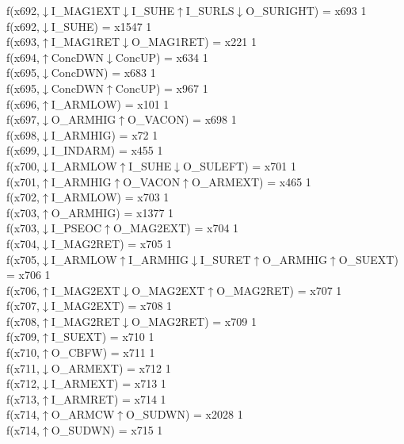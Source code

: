 f(x692,$\downarrow$I\_MAG1EXT$\downarrow$I\_SUHE$\uparrow$I\_SURLS$\downarrow$O\_SURIGHT) = x693 {1} \\
f(x692,$\downarrow$I\_SUHE) = x1547 {1} \\
f(x693,$\uparrow$I\_MAG1RET$\downarrow$O\_MAG1RET) = x221 {1} \\
f(x694,$\uparrow$ConcDWN$\downarrow$ConcUP) = x634 {1} \\
f(x695,$\downarrow$ConcDWN) = x683 {1} \\
f(x695,$\downarrow$ConcDWN$\uparrow$ConcUP) = x967 {1} \\
f(x696,$\uparrow$I\_ARMLOW) = x101 {1} \\
f(x697,$\downarrow$O\_ARMHIG$\uparrow$O\_VACON) = x698 {1} \\
f(x698,$\downarrow$I\_ARMHIG) = x72 {1} \\
f(x699,$\downarrow$I\_INDARM) = x455 {1} \\
f(x700,$\downarrow$I\_ARMLOW$\uparrow$I\_SUHE$\downarrow$O\_SULEFT) = x701 {1} \\
f(x701,$\uparrow$I\_ARMHIG$\uparrow$O\_VACON$\uparrow$O\_ARMEXT) = x465 {1} \\
f(x702,$\uparrow$I\_ARMLOW) = x703 {1} \\
f(x703,$\uparrow$O\_ARMHIG) = x1377 {1} \\
f(x703,$\downarrow$I\_PSEOC$\uparrow$O\_MAG2EXT) = x704 {1} \\
f(x704,$\downarrow$I\_MAG2RET) = x705 {1} \\
f(x705,$\downarrow$I\_ARMLOW$\uparrow$I\_ARMHIG$\downarrow$I\_SURET$\uparrow$O\_ARMHIG$\uparrow$O\_SUEXT) = x706 {1} \\
f(x706,$\uparrow$I\_MAG2EXT$\downarrow$O\_MAG2EXT$\uparrow$O\_MAG2RET) = x707 {1} \\
f(x707,$\downarrow$I\_MAG2EXT) = x708 {1} \\
f(x708,$\uparrow$I\_MAG2RET$\downarrow$O\_MAG2RET) = x709 {1} \\
f(x709,$\uparrow$I\_SUEXT) = x710 {1} \\
f(x710,$\uparrow$O\_CBFW) = x711 {1} \\
f(x711,$\downarrow$O\_ARMEXT) = x712 {1} \\
f(x712,$\downarrow$I\_ARMEXT) = x713 {1} \\
f(x713,$\uparrow$I\_ARMRET) = x714 {1} \\
f(x714,$\uparrow$O\_ARMCW$\uparrow$O\_SUDWN) = x2028 {1} \\
f(x714,$\uparrow$O\_SUDWN) = x715 {1} \\
